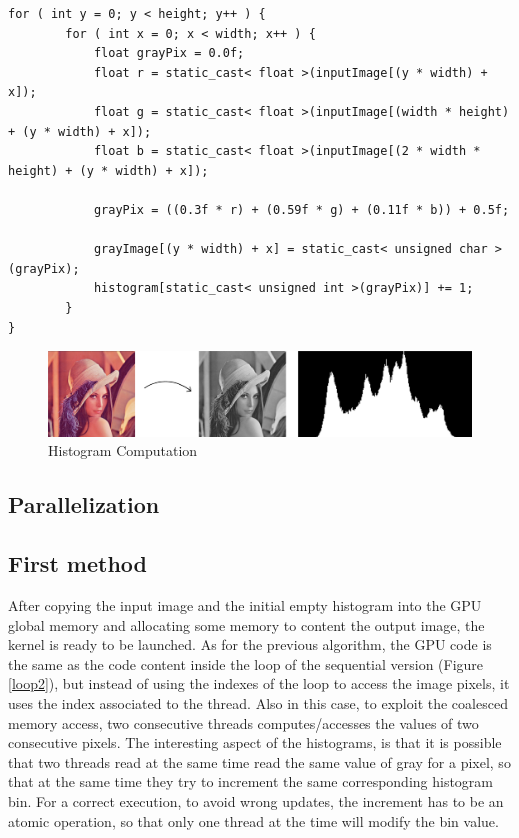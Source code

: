 \documentclass[a4paper]{article}
\begin{document}
\begin{lstlisting}[label=loop2, caption=Sequential code]
for ( int y = 0; y < height; y++ ) {
		for ( int x = 0; x < width; x++ ) {
			float grayPix = 0.0f;
			float r = static_cast< float >(inputImage[(y * width) + x]);
			float g = static_cast< float >(inputImage[(width * height) + (y * width) + x]);
			float b = static_cast< float >(inputImage[(2 * width * height) + (y * width) + x]);

			grayPix = ((0.3f * r) + (0.59f * g) + (0.11f * b)) + 0.5f;

			grayImage[(y * width) + x] = static_cast< unsigned char >(grayPix);
			histogram[static_cast< unsigned int >(grayPix)] += 1;
		}
}
\end{lstlisting}

\begin{figure}[ht]
    \centering
    \includegraphics[width=0.7\linewidth]{histo}
    \caption{Histogram Computation}
    \label{fig:histo}
\end{figure}
\FloatBarrier

\subsection{Parallelization}
\label{sec:p2}
\subsection{First method}
\label{sec:fm2}
After copying the input image and the initial empty histogram into the GPU global memory and allocating some memory to content the output image, the kernel is ready to be launched. As for the previous algorithm, the GPU code is the same as the code content inside the loop of the sequential version (Figure \ref{loop2}), but instead of using the indexes of the loop to access the image pixels, it uses the index associated to the thread. Also in this case, to exploit the coalesced memory access, two consecutive threads computes/accesses the values of two consecutive pixels. The interesting aspect of the histograms, is that it is possible that two threads read at the same time read the same value of gray for a pixel, so that at the same time they try to increment the same corresponding histogram bin. For a correct execution, to avoid wrong updates, the increment has to be an atomic operation, so that only one thread at the time will modify the bin value. 
\end{document}
